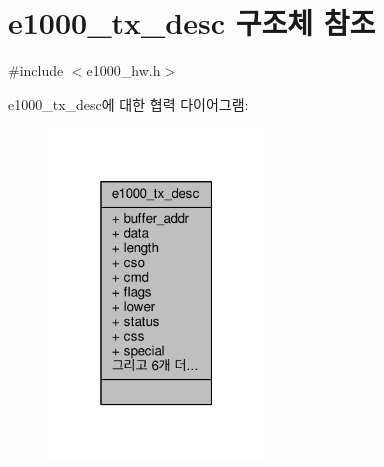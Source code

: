 \hypertarget{structe1000__tx__desc}{}\section{e1000\+\_\+tx\+\_\+desc 구조체 참조}
\label{structe1000__tx__desc}


{\ttfamily \#include $<$e1000\+\_\+hw.\+h$>$}



e1000\+\_\+tx\+\_\+desc에 대한 협력 다이어그램\+:
\nopagebreak
\begin{figure}[H]
\begin{center}
\leavevmode
\includegraphics[width=163pt]{structe1000__tx__desc__coll__graph}
\end{center}
\end{figure}
